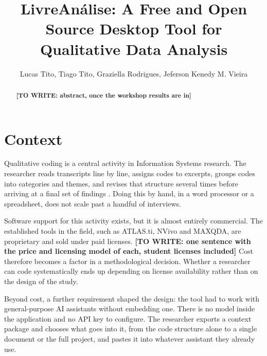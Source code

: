 \documentclass[12pt]{article}
\title{LivreAn\'alise: A Free and Open Source Desktop Tool for\\ Qualitative Data Analysis}
\author{Lucas Tito\inst{1}, Tiago Tito\inst{2},
  Graziella Rodrigues\inst{2}, Jeferson Kenedy M. Vieira\inst{2}}
\newcommand{\todo}[1]{\textbf{[TO WRITE: #1]}}
\begin{document}
 

\maketitle

\begin{abstract}
  \todo{abstract, once the workshop results are in}
\end{abstract}
     


\section{Context}

Qualitative coding is a central activity in Information Systems research. The
researcher reads transcripts line by line, assigns codes to excerpts, groups
codes into categories and themes, and revises that structure several times
before arriving at a final set of findings \cite{braun:06}. Doing this by hand,
in a word processor or a spreadsheet, does not scale past a handful of
interviews.

Software support for this activity exists, but it is almost entirely
commercial. The established tools in the field, such as ATLAS.ti, NVivo and
MAXQDA, are proprietary and sold under paid licenses.
\todo{one sentence with the price and licensing model of each, student licenses
included}
Cost therefore becomes a factor in a methodological decision. Whether a
researcher can code systematically ends up depending on license availability
rather than on the design of the study.


Beyond cost, a further requirement shaped the design: the tool had to work with
general-purpose AI assistants without embedding one. There is no model inside
the application and no API key to configure. The researcher exports a context
package and chooses what goes into it, from the code structure alone to a
single document or the full project, and pastes it into whatever assistant they
already use.
\end{document}
